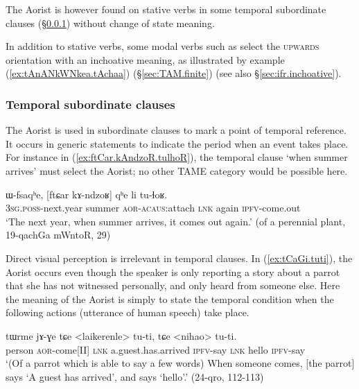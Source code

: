The Aorist is however found on stative verbs in some temporal subordinate clauses (§\ref{sec:aor.temporal}) without change of state meaning. 

In addition to stative verbs, some modal verbs such as  select the \textsc{upwards} orientation with an inchoative meaning, as illustrated by example (\ref{ex:tAnANkWNkea.tAchaa}) (§\ref{sec:TAM.finite}) (see also §\ref{sec:ifr.inchoative}).
 


\subsubsection{Temporal subordinate clauses }   \label{sec:aor.temporal}
The Aorist is used in subordinate clauses to mark a point of temporal reference. It occurs in generic statements to indicate the period when an event takes place. For instance in  (\ref{ex:ftCar.kAndzoR.tulhoR}), the temporal clause  `when summer arrives' must select the Aorist; no other TAME category would be possible here.

\begin{exe}
\ex \label{ex:ftCar.kAndzoR.tulhoR}
 \gll ɯ-fsaqʰe, [ftɕar kɤ-ndzoʁ] qʰe li tu-ɬoʁ. \\
 \textsc{3sg}.\textsc{poss}-next.year summer \textsc{aor}-\textsc{acaus}:attach \textsc{lnk} again \textsc{ipfv}-come.out \\
 \glt `The next year, when summer arrives, it comes out again.' (of a perennial plant, 19-qachGa mWntoR, 29)
\end{exe}

Direct visual perception is irrelevant in temporal clauses. In (\ref{ex:tCaGi.tuti}), the Aorist  occurs even though the speaker is only reporting a story about a parrot that she has not witnessed personally, and only heard from someone else. Here the meaning of the Aorist is simply to state the temporal condition when the following actions (utterance of human speech) take place.

\begin{exe}
\ex \label{ex:tCaGi.tuti}
 \gll tɯrme jɤ-ɣe tɕe <laikerenle> tu-ti, tɕe <nihao>  tu-ti. \\
 person \textsc{aor}-come[II] \textsc{lnk} a.guest.has.arrived \textsc{ipfv}-say \textsc{lnk} hello \textsc{ipfv}-say  \\
 \glt `(Of a parrot which is able to say a few words) When someone comes, [the parrot] says `A guest has arrived', and says `hello'.' (24-qro, 112-113)
\end{exe}


